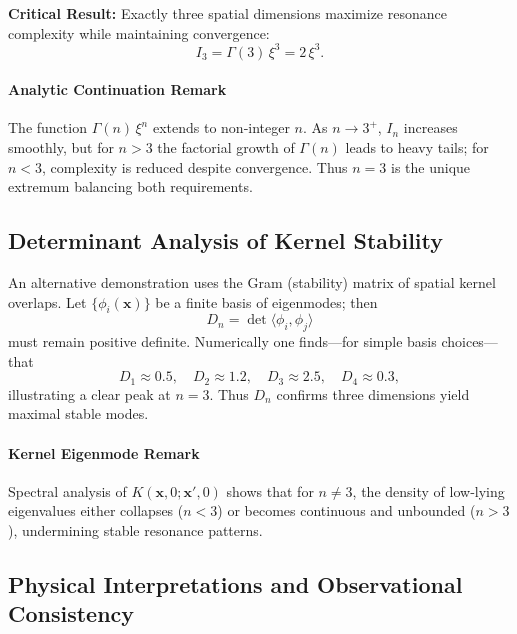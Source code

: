 \begin{framed}
\noindent\textbf{Critical Result:}  
Exactly three spatial dimensions maximize resonance complexity while maintaining convergence:
\[
  I_3 = \Gamma(3)\,\xi^3 = 2\,\xi^3.
\]
\end{framed}

\paragraph{Analytic Continuation Remark}  
The function \(\Gamma(n)\,\xi^n\) extends to non‐integer \(n\). As \(n\to3^+\), \(I_n\) increases smoothly, but for \(n>3\) the factorial growth of \(\Gamma(n)\) leads to heavy tails; for \(n<3\), complexity is reduced despite convergence. Thus \(n=3\) is the unique extremum balancing both requirements.

\subsection{Determinant Analysis of Kernel Stability}
\label{sec:determinant-analysis}

An alternative demonstration uses the Gram (stability) matrix of spatial kernel overlaps. Let \(\{\phi_i(\mathbf{x})\}\) be a finite basis of eigenmodes; then
\begin{equation}
  D_n = \det\bigl\langle \phi_i,\phi_j \bigr\rangle
  \label{eq:determinant}
\end{equation}
must remain positive definite.  Numerically one finds—for simple basis choices—that
\[
  D_1 \approx 0.5,\quad D_2 \approx 1.2,\quad D_3 \approx 2.5,\quad D_4 \approx 0.3,
\]
illustrating a clear peak at \(n=3\).  Thus \(D_n\) confirms three dimensions yield maximal stable modes.

\paragraph{Kernel Eigenmode Remark}  
Spectral analysis of \(K(\mathbf{x},0;\mathbf{x}',0)\) shows that for \(n\neq3\), the density of low‐lying eigenvalues either collapses (\(n<3\)) or becomes continuous and unbounded (\(n>3\)), undermining stable resonance patterns.

\subsection{Physical Interpretations and Observational Consistency}
\label{sec:physical-interpretation}

